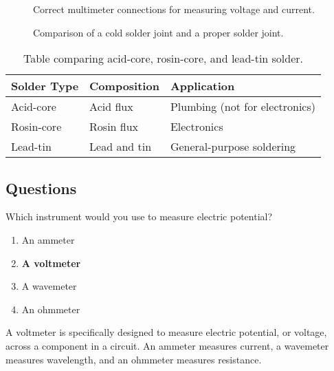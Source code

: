 \begin{figure}[h]
    \centering
    \caption{Correct multimeter connections for measuring voltage and current.}
    \label{fig:multimeter_connections}
\end{figure}

\begin{figure}[h]
    \centering
    \caption{Comparison of a cold solder joint and a proper solder joint.}
    \label{fig:solder_joint_comparison}
\end{figure}

\begin{table}[h]
    \centering
    \begin{tabular}{|l|l|l|}
        \hline
        \textbf{Solder Type} & \textbf{Composition} & \textbf{Application} \\
        \hline
        Acid-core & Acid flux & Plumbing (not for electronics) \\
        Rosin-core & Rosin flux & Electronics \\
        Lead-tin & Lead and tin & General-purpose soldering \\
        \hline
    \end{tabular}
    \caption{Table comparing acid-core, rosin-core, and lead-tin solder.}
    \label{tab:solder_comparison}
\end{table}

\subsection*{Questions}
\begin{tcolorbox}[colback=gray!10!white,colframe=black!75!black,title={T7D01}]
    Which instrument would you use to measure electric potential?
    \begin{enumerate}[label=\Alph*,noitemsep]
        \item An ammeter
        \item \textbf{A voltmeter}
        \item A wavemeter
        \item An ohmmeter
    \end{enumerate}
\end{tcolorbox}
A voltmeter is specifically designed to measure electric potential, or voltage, across a component in a circuit. An ammeter measures current, a wavemeter measures wavelength, and an ohmmeter measures resistance.

